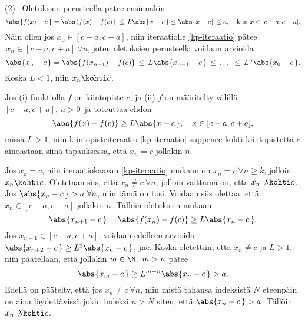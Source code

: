 (2) \ Oletuksien perusteella pätee ensinnäkin
\[
\abs{f(x)-c\,} = \abs{f(x)-f(c)} \,\le\, L\abs{x-c\,} \le \abs{x-c} \le a, 
                                          \quad \text{kun}\ x\in[c-a,c+a]. 
\]
Näin ollen jos $x_0 \in [c-a,c+a]$, niin  iteraatiolle \eqref{kp-iteraatio} pätee 
$\,x_n \in [c-a,c+a]\ \forall n$, joten oletuksien perusteella voidaan arvioida
\[
\abs{x_n-c\,} = \abs{f(x_{n-1})-f(c)} \,\le\, L\abs{x_{n-1}-c\,} \,\le\, \ldots\ 
                                      \,\le\, L^n\abs{x_0-c\,}.
\]
Koska $L<1$, niin $x_n \kohti c$. \loppu
\begin{Lause} \label{kp-lause 2} Jos (i) funktiolla $f$ on kiintopiste $c$, ja (ii) $f$ on 
määritelty välillä $[c-a,c+a],\ a>0\,$ ja toteuttaa ehdon
\[
\abs{f(x)-f(c)} \ge L\abs{x-c\,}, \quad x \in [c-a,c+a],
\]
missä $L>1$, niin kiintopisteiteraatio \eqref{kp-iteraatio} suppenee kohti kiintopistettä $c$ 
ainoastaan siinä tapauksessa, että $x_n=c$ jollakin $n$. 
\end{Lause}
\tod Jos $x_k=c$, niin iteraatiokaavan \eqref{kp-iteraatio} mukaan on $x_n=c\ \forall n \ge k$,
jolloin $x_n \kohti c$. Oletetaan siis, että $x_n \neq c\ \forall n$, jolloin väittämä on, että
$x_n \not\kohti c$. Jos $\abs{x_n-c\,} > a\ \forall n$, niin tämä on tosi. Voidaan siis olettaa,
että $x_n \in [c-a,c+a]$ jollakin $n$. Tällöin oletuksien mukaan
\[
\abs{x_{n+1}-c\,} = \abs{f(x_n)-f(c)} \ge L\abs{x_n-c\,}.
\]
Jos $x_{n+1} \in [c-a,c+a]$, voidaan edelleen arvioida $\abs{x_{n+2}-c\,} \ge L^2\abs{x_n-c\,}$,
jne. Koska oletettiin, että $x_n \neq c$ ja $L>1$, niin päätellään, että jollakin 
$m \in \N,\ m>n$ pätee
\[
\abs{x_m-c\,} \ge L^{m-n}\abs{x_n-c\,} > a.
\]
Edellä on päätelty, että jos $x_n \neq c\ \forall n$, niin mistä tahansa indeksistä $N$ 
eteenpäin on aina löydettävissä jokin indeksi $n>N$ siten, että $\abs{x_n-c\,} > a$. Tällöin 
$x_n \not\kohti c$. \loppu

